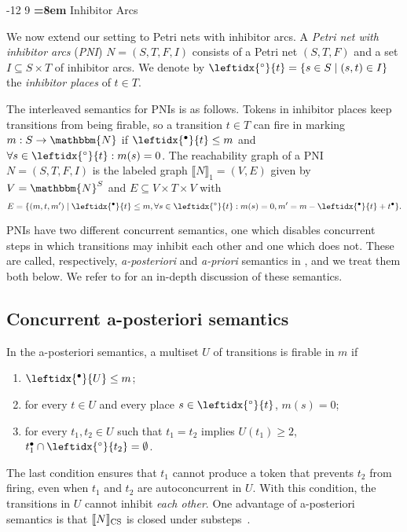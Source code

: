 \documentclass[runningheads,envcountsame]{llncs}
\makeatletter
\newcommand*\Nat{\mathbbm{N}}
\newcommand*\prepla[1]{\leftidx{^\bullet}{#1}}
\newcommand*\pospla[1]{#1^\bullet}
\newcommand*\prepli[1]{\leftidx{^\circ}{#1}}
\newcommand*\sem[1]{\llbracket #1\rrbracket}
\renewcommand\section{\@startsection{section}{1}{\z@}%
  {-12\p@ \@plus -3\p@ \@minus -3\p@}%
  {9\p@ \@plus 3\p@ \@minus 3\p@}%
  {\normalfont\large\bfseries\boldmath
    \rightskip=\z@ \@plus 8em\pretolerance=10000 }}
\makeatother
\begin{document}
\section{Inhibitor Arcs}
\label{sec:inhibitor}

We now extend our setting to Petri nets with inhibitor arcs.
%
A \emph{Petri net with inhibitor arcs} (\emph{PNI}) $N=(S, T, F, I)$
consists of a Petri net $(S, T, F)$
and a set $I\subseteq S\times T$ of inhibitor arcs.
We denote by $\prepli{t}=\{s\in S\mid (s, t)\in I\}$
the \emph{inhibitor places} of $t\in T$.

The interleaved semantics for PNIs is as follows.
Tokens in inhibitor places keep transitions from being firable,
so a transition $t\in T$ can fire in marking $m: S\to \Nat$ if $\prepla{t}\le m$ and $\forall s\in \prepli{t}: m(s)=0$.
%
The reachability graph of a PNI $N=(S, T, F, I)$
is the labeled graph $\sem{N}_1=(V, E)$ given by $V=\Nat^S$ and $E\subseteq V\times T\times V$ with
\begin{equation*}
  E = \{(m, t, m')\mid \prepla{t}\le m, \forall s\in \prepli{t}: m(s)=0, m'=m-\prepla{t}+\pospla{t}\}.
\end{equation*}

PNIs have two different concurrent semantics,
one which disables concurrent steps in which transitions may inhibit each other
and one which does not.
These are called, respectively, \emph{a-posteriori} and \emph{a-priori} semantics in \cite{DBLP:journals/iandc/JanickiK95},
and we treat them both below.
We refer to \cite[Sect.~2]{DBLP:journals/iandc/JanickiK95} for an in-depth discussion of these semantics.

\subsection{Concurrent a-posteriori semantics}

In the a-posteriori semantics, a multiset $U$ of transitions is firable in
$m$ if
\begin{enumerate}[(1)]
\item $\prepla{U}\le m$;
\item for every $t\in U$ and every place $s\in \prepli{t}$, $m(s)=0$;
\item \label{en:busi} for every $t_1, t_2\in U$ such that $t_1=t_2$ implies $U(t_1)\ge 2$,
  $\pospla{t_1}\cap\prepli{t_2}=\emptyset$.
\end{enumerate}

The last condition ensures that $t_1$ cannot produce a token that prevents $t_2$ from firing,
even when $t_1$ and $t_2$ are autoconcurrent in $U$. With this condition,
the transitions in $U$ cannot inhibit \emph{each other}.
One advantage of a-posteriori semantics is that
$\sem{N}_{\textup{CS}}$ is closed under substeps~\cite[Prop.~2.8]{DBLP:journals/tcs/Busi02}.
\end{document}
